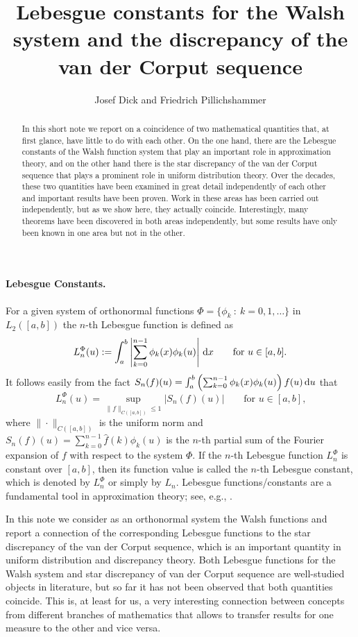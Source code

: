\documentclass[12pt]{article}
\title{Lebesgue constants for the Walsh system and the discrepancy of the van der Corput sequence}
\author{Josef Dick and Friedrich Pillichshammer}
\date{}
\newcommand{\rd}{\,{\rm d}}
\begin{document}
\maketitle

\begin{abstract}
In this short note we report on a coincidence of two mathematical quantities that, at first glance, have little to do with each other. On the one hand, there are the Lebesgue constants of the Walsh function system that play an important role in approximation theory, and on the other hand there is the star discrepancy of the van der Corput sequence that plays a prominent role in uniform distribution theory. Over the decades, these two quantities have been examined in great detail independently of each other and important results have been proven. Work in these areas has been carried out independently, but as we show here, they actually coincide. Interestingly, many theorems have been discovered in both areas independently, but some results have only been known in one area but not in the other.
\end{abstract}

\paragraph{Lebesgue Constants.} For a given system of orthonormal functions $\Phi=\{\phi_k \ : \ k =0,1,\ldots\}$ in $L_2([a,b])$ the $n$-th Lebesgue function is defined as 
\begin{equation*}
L_n^{\Phi}(u):=\int_a^b \left|\sum_{k=0}^{n-1} \phi_k(x) \phi_k(u) \right| \rd x\qquad \mbox{for $u \in [a,b]$.}
\end{equation*}
It follows easily from the fact $S_n(f)(u)=\int_a^b \left(\sum_{k=0}^{n-1} \phi_k(x) \phi_k(u)\right) f(u)\rd u$ that 
\begin{equation*}
L_n^{\Phi}(u)=\sup_{\|f\|_{C([a,b])} \le 1} |S_n(f)(u)|\qquad \mbox{for $u \in [a,b]$,}
\end{equation*}
where $\|\cdot \|_{C([a,b])}$ is the uniform norm and $S_n(f)(u)=\sum_{k=0}^{n-1} \widehat{f}(k) \phi_k(u)$ is the $n$-th partial sum of the Fourier expansion of $f$ with respect to the system $\Phi$. If the $n$-th Lebesgue function $L_n^{\Phi}$ is constant over $[a,b]$, then its function value is called the $n$-th Lebesgue constant, which is denoted by $L_n^{\Phi}$ or simply by $L_n$. Lebesgue functions/constants are a fundamental tool in approximation theory; see, e.g., \cite{AT,KS,SWS,zyg}.

In this note we consider as an orthonormal system the Walsh functions and report a connection of the corresponding Lebesgue functions to the star discrepancy of the van der Corput sequence, which is an important quantity in uniform distribution and discrepancy theory. Both Lebesgue functions for the Walsh system and star discrepancy of van der Corput sequence are well-studied objects in literature, but so far it has not been observed that both quantities coincide. This is, at least for us, a very interesting connection between concepts from different branches of mathematics that allows to transfer results for one measure to the other and vice versa.  
\end{document}
